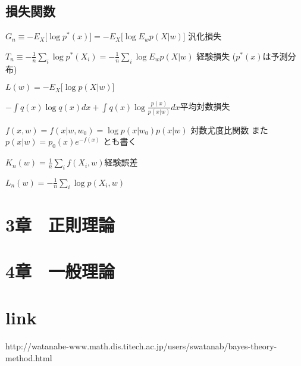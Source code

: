 \documentclass[10pt]{article}
\begin{document}
\begin{description}
\subsection*{損失関数}
\item{$G_n \equiv -E_X \bigl[ \log p^*(x) \bigr] =-E_X\bigl[ \log E_w p(X|w) \bigr] $} 汎化損失 
\item{$T_n \equiv -\frac{1}{n}\sum_i \log p^*(X_i) =-\frac{1}{n}\sum_i \log E_w p(X|w) $} 経験損失 ($p^*(x)$は予測分布)
\item{$L(w)=-E_X \bigl[ \log p(X|w) \bigr] $} 
\item{$-\int q(x)\log q(x)dx+\int q(x)\log\frac{p(x)}{p(x|w)} dx $}平均対数損失
\item{$f(x,w)=f(x|w,w_0)=\log{p(x|w_0)}{p(x|w)}$} 対数尤度比関数 また$p(x|w)=p_0(x)e^{-f(x)}$ とも書く
\item{$K_n(w)=\frac{1}{n}\sum_i f(X_i,w)$}経験誤差
\item{$L_n(w)=-\frac{1}{n}\sum_i \log p(X_i,w)$}

\end{description}

\section*{3章　正則理論}

\section*{4章　一般理論}

\section*{link}
http://watanabe-www.math.dis.titech.ac.jp/users/swatanab/bayes-theory-method.html
\end{document}

